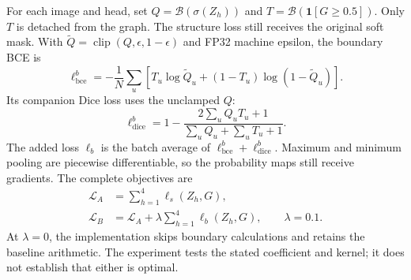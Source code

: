 \documentclass[conference,letterpaper]{IEEEtran}
\begin{document}
For each image and head, set $Q=\mathcal B(\sigma(Z_h))$ and $T=\mathcal B(\mathbf1[G\geq0.5])$. Only $T$ is detached from the graph. The structure loss still receives the original soft mask. With $\widetilde Q=\operatorname{clip}(Q,\epsilon,1-\epsilon)$ and FP32 machine epsilon, the boundary BCE is
\begin{equation}
 \ell_{\mathrm{bce}}^{b}=
 -\frac1N\sum_u\!
 \left[T_u\log\widetilde Q_u+
 (1-T_u)\log(1-\widetilde Q_u)\right].
 \label{eq:boundarybce}
\end{equation}
Its companion Dice loss uses the unclamped $Q$:
\begin{equation}
 \ell_{\mathrm{dice}}^{b}
 =1-\frac{2\sum_u Q_uT_u+1}
 {\sum_u Q_u+\sum_u T_u+1}.
 \label{eq:boundarydice}
\end{equation}
The added loss $\ell_b$ is the batch average of
$\ell_{\mathrm{bce}}^{b}+\ell_{\mathrm{dice}}^{b}$. Maximum and minimum pooling are piecewise differentiable, so the probability maps still receive gradients. The complete objectives are
\begin{equation}
\begin{aligned}
 \mathcal L_A&=\sum_{h=1}^{4}\ell_s(Z_h,G),\\
 \mathcal L_B&=\mathcal L_A+
 \lambda\sum_{h=1}^{4}\ell_b(Z_h,G),\qquad \lambda=0.1.
\end{aligned}
\label{eq:objectives}
\end{equation}
At $\lambda=0$, the implementation skips boundary calculations and retains the baseline arithmetic. The experiment tests the stated coefficient and kernel; it does not establish that either is optimal.
\end{document}
